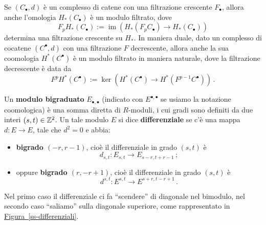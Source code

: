 \begin{oss}
	Se $(C_{\bullet}, d)$ è un complesso di catene con una filtrazione 
	crescente $F_{\bullet}$,
	allora anche l'omologia $H_{*}(C_{\bullet})$ è un modulo filtrato,
	dove
	\begin{equation*}
		F_{p}H_{*}(C_{\bullet}) := 
		\operatorname{im}\left( H_{*}(F_{p}C_{\bullet}) \to H_{*}(C_{\bullet}) \right)
	\end{equation*}
	determina una filtrazione crescente su $H_{*}$.
	In maniera duale, dato un complesso di cocatene 
	 $(C^{\bullet}, d)$ con una filtrazione $F$ decrescente,
	allora anche la sua coomologia $H^{*}(C^{\bullet})$ 
	è un modulo filtrato in maniera naturale,
	dove la filtrazione decrescente è data da
	\begin{equation*}
		F^{p}H^{*}(C^{\bullet}) := 
		\ker \left( H^{*}(C^{\bullet}) \to H^{*}(F^{p-1}C^{\bullet}) \right)\,.
	\end{equation*}
\end{oss}

\begin{df}
	Un \textbf{modulo bigraduato} $E_{\bullet,\bullet}$ 
	(indicato con $E^{\bullet,\bullet}$ se usiamo la notazione coomologica)
	è una somma diretta di $R$-moduli,
	i cui gradi sono definiti da due interi $(s,t) \in {\mathbb Z}^{2}$.
	Un tale modulo $E$ si dice \textbf{differenziale} 
	se c'è una mappa $d:E \to E$, tale che $d^{2}=0$ e abbia:
		\begin{itemize}
		\item \textbf{bigrado $(-r,r-1)$}, cioè il differenziale
		in grado $(s,t)$ è $$d_{s,t}:E_{s,t} \to E_{s-r,t+r-1}\,;$$
		
		\item oppure \textbf{bigrado $(r,-r+1)$},
		cioè il differenziale
		in grado $(s,t)$ è $$d^{s,t}:E^{s,t} \to E^{s+r,t-r+1}\,.$$
		\end{itemize}
	Nel primo caso il differenziale ci fa ``scendere'' di diagonale nel bimodulo,
	nel secondo caso ``saliamo'' sulla diagonale superiore,
	come rappresentato in \hyperref[ss-differenziale]{Figura~\ref{ss-differenziali}}.
\end{df}


